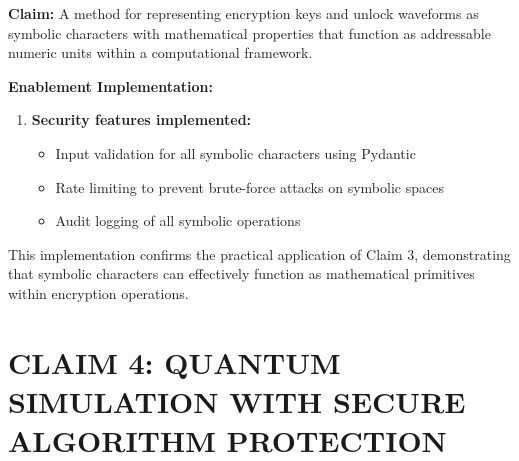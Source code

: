 \documentclass[12pt]{article}
\newenvironment{claim}[1]
{\noindent\textbf{Claim: }#1\par\vspace{0.5em}\noindent\textbf{Enablement Implementation:}\par\vspace{0.5em}}
{}
\begin{document}
\begin{claim}{A method for representing encryption keys and unlock waveforms as symbolic characters with mathematical properties that function as addressable numeric units within a computational framework.}
\begin{enumerate}
\item \textbf{Security features implemented:}
   \begin{itemize}
   \item Input validation for all symbolic characters using Pydantic
   \item Rate limiting to prevent brute-force attacks on symbolic spaces
   \item Audit logging of all symbolic operations
   \end{itemize}
\end{enumerate}

This implementation confirms the practical application of Claim 3, demonstrating that symbolic characters can effectively function as mathematical primitives within encryption operations.
\end{claim}

\section{CLAIM 4: QUANTUM SIMULATION WITH SECURE ALGORITHM PROTECTION}
\label{sec:claim4}
\end{document}
